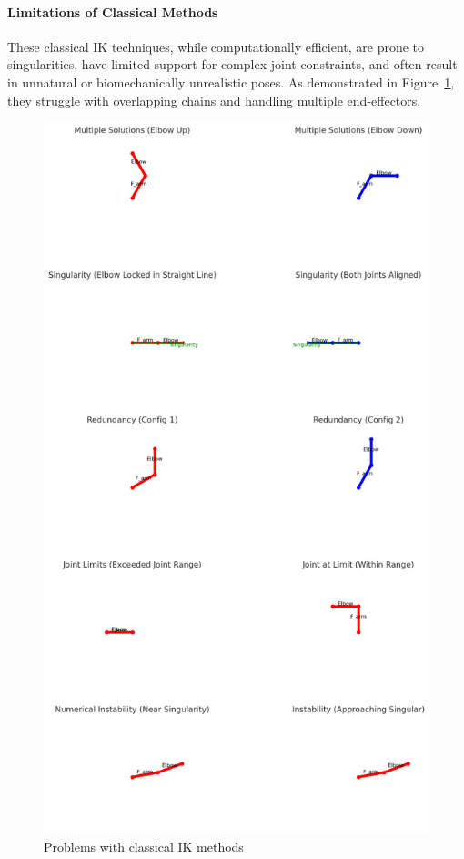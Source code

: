 \documentclass[../../main.tex]{subfiles}
\begin{document}
\paragraph{Limitations of Classical Methods} These classical IK techniques, while computationally efficient, are prone to singularities, have limited support for complex joint constraints, and often result in unnatural or biomechanically unrealistic poses. As demonstrated in Figure~\ref{fig:problems_classical}, they struggle with overlapping chains and handling multiple end-effectors.

\begin{figure}
  \centering \includegraphics[width = 5in]{chapters/pose_correction/images/problems_classical.png}
  \caption{Problems with classical IK methods}
  \label{fig:problems_classical}
\end{figure}
\end{document}
